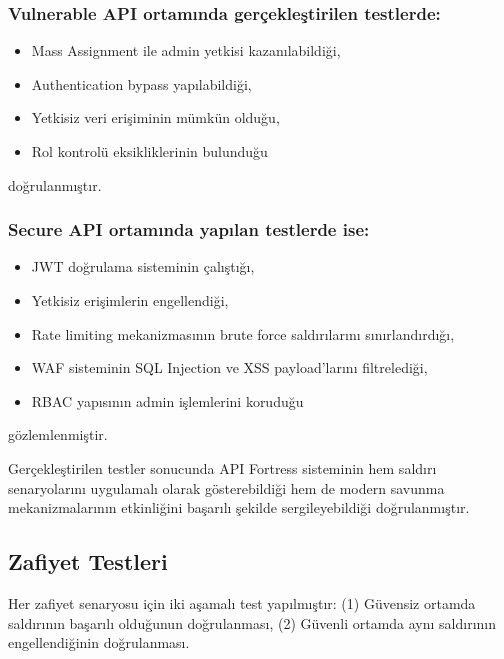 \subsubsection{Vulnerable API ortamında gerçekleştirilen testlerde:}

\begin{itemize}[leftmargin=*]
    \item Mass Assignment ile admin yetkisi kazanılabildiği,
    \item Authentication bypass yapılabildiği,
    \item Yetkisiz veri erişiminin mümkün olduğu,
    \item Rol kontrolü eksikliklerinin bulunduğu
\end{itemize}

doğrulanmıştır.

\subsubsection{Secure API ortamında yapılan testlerde ise:}

\begin{itemize}[leftmargin=*]
    \item JWT doğrulama sisteminin çalıştığı,
    \item Yetkisiz erişimlerin engellendiği,
    \item Rate limiting mekanizmasının brute force saldırılarını sınırlandırdığı,
    \item WAF sisteminin SQL Injection ve XSS payload’larını filtrelediği,
    \item RBAC yapısının admin işlemlerini koruduğu
\end{itemize}

gözlemlenmiştir.

Gerçekleştirilen testler sonucunda API Fortress sisteminin hem saldırı senaryolarını uygulamalı olarak gösterebildiği hem de modern savunma mekanizmalarının etkinliğini başarılı şekilde sergileyebildiği doğrulanmıştır.

\subsection{Zafiyet Testleri}
\label{zafiyet-testleri}

Her zafiyet senaryosu için iki aşamalı test yapılmıştır: (1) Güvensiz ortamda saldırının başarılı olduğunun doğrulanması, (2) Güvenli ortamda aynı saldırının engellendiğinin doğrulanması.

